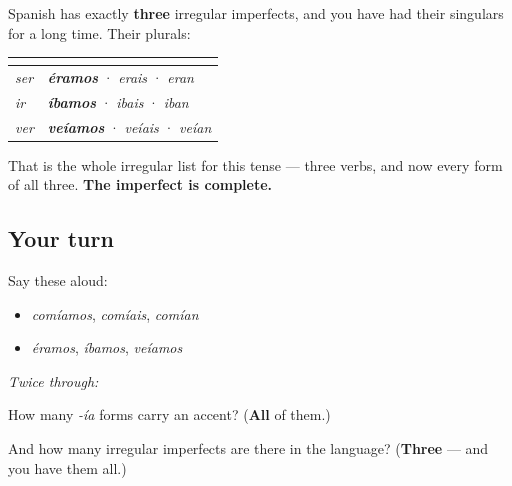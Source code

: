 \begin{grammarlens}[title={Grammar Lens: and the three irregulars}]
Spanish has exactly \textbf{three} irregular imperfects, and you have had their singulars for a long time. Their plurals:

\noindent
\begin{tabularx}{\linewidth}{@{}>{\raggedright\arraybackslash}X>{\raggedright\arraybackslash}X@{}}
\toprule
\textbf{} & \textbf{} \\
\midrule
\emph{ser} & \emph{\textbf{éramos}} · \emph{erais} · \emph{eran} \\
\emph{ir} & \emph{\textbf{íbamos}} · \emph{ibais} · \emph{iban} \\
\emph{ver} & \emph{\textbf{veíamos}} · \emph{veíais} · \emph{veían} \\
\bottomrule
\end{tabularx}

That is the whole irregular list for this tense — three verbs, and now every form of all three. \textbf{The imperfect is complete.}
\end{grammarlens}

\subsection*{Your turn}
Say these aloud:

\begin{itemize}
\raggedright
  \item \emph{comíamos}, \emph{comíais}, \emph{comían}
  \item \emph{éramos}, \emph{íbamos}, \emph{veíamos}
\end{itemize}

\emph{Twice through:}

\begin{tcolorbox}[breakable,colback=teal!4,colframe=teal!35!black,title={Before you move on}]
How many \emph{-ía} forms carry an accent? (\textbf{All} of them.)

And how many irregular imperfects are there in the language? (\textbf{Three} — and you have them all.)
\end{tcolorbox}
